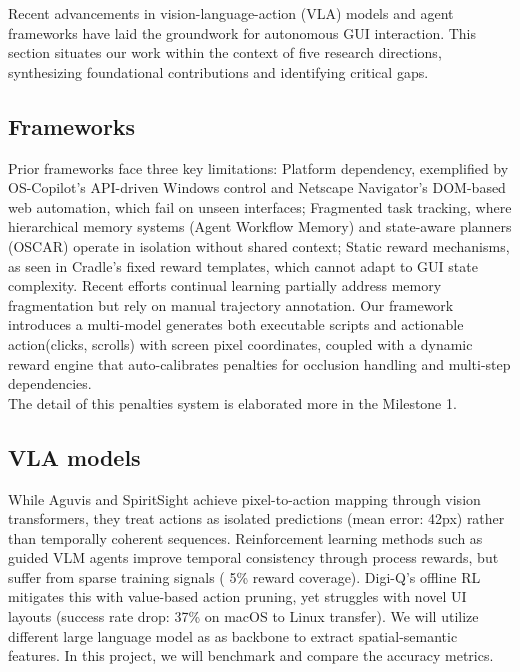 \documentclass[11pt,letterpaper]{article}
\begin{document}
Recent advancements in vision-language-action (VLA) models and agent frameworks have laid the groundwork for autonomous GUI interaction. This section situates our work within the context of five research directions, synthesizing foundational contributions and identifying critical gaps.

\subsection{Frameworks}
Prior frameworks face three key limitations: Platform dependency, exemplified by OS-Copilot's API-driven Windows control and Netscape Navigator's DOM-based web automation, which fail on unseen interfaces; Fragmented task tracking, where hierarchical memory systems (Agent Workflow Memory) and state-aware planners (OSCAR) operate in isolation without shared context; Static reward mechanisms, as seen in Cradle's fixed reward templates, which cannot adapt to GUI state complexity. Recent efforts continual learning partially address memory fragmentation but rely on manual trajectory annotation. Our framework introduces a multi-model generates both executable scripts and actionable action(clicks, scrolls) with screen pixel coordinates, coupled with a dynamic reward engine that auto-calibrates penalties for occlusion handling and multi-step dependencies. \\
The detail of this penalties system is elaborated more in the Milestone 1.

\subsection{VLA models}
While Aguvis and SpiritSight achieve pixel-to-action mapping through vision transformers, they treat actions as isolated predictions (mean error: 42px) rather than temporally coherent sequences. Reinforcement learning methods such as guided VLM agents improve temporal consistency through process rewards, but suffer from sparse training signals ( 5\% reward coverage). Digi-Q's offline RL mitigates this with value-based action pruning, yet struggles with novel UI layouts (success rate drop: 37\% on macOS to Linux transfer). We will utilize different large language model as as backbone to extract spatial-semantic features. In this project, we will benchmark and compare the accuracy metrics.
\end{document}
